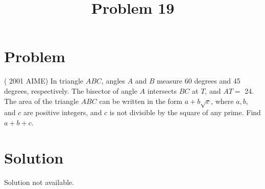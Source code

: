 \documentclass{article}
\title{Problem 19}
\date{}
\begin{document}
\maketitle

\section*{Problem}
( 2001 AIME) In triangle \(A B C\), angles \(A\) and \(B\) measure 60 degrees and 45 degrees, respectively. The bisector of angle \(A\) intersects \(B C\) at \(T\), and \(A T=\) 24. The area of the triangle \(A B C\) can be written in the form \(a+b \sqrt{c}\), where \(a, b\), and \(c\) are positive integers, and \(c\) is not divisible by the square of any prime. Find \(a+b+c\).

\section*{Solution}
Solution not available.
\end{document}
